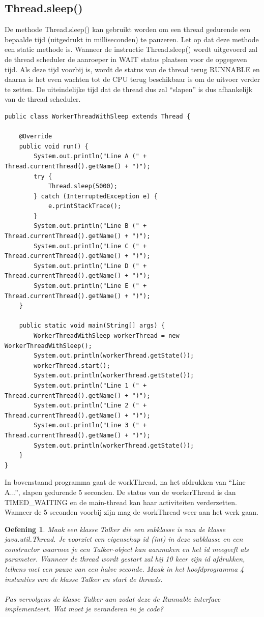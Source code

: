 \documentclass{tstextbook}
\newtheorem{envoefening}{Oefening}[chapter]
\newenvironment{oefening}
               {\begin{boxexercise}\begin{envoefening}}
               {\end{envoefening}\end{boxexercise}}
\begin{document}
\subsection{Thread.sleep()}

De methode Thread.sleep() kan gebruikt worden om een thread gedurende een bepaalde tijd (uitgedrukt in milliseconden) te pauzeren.
Let op dat deze methode een static methode is.
Wanneer de instructie Thread.sleep() wordt uitgevoerd zal de thread scheduler de aanroeper in WAIT status plaatsen voor de opgegeven tijd. Als deze tijd voorbij is, wordt de status van de thread terug RUNNABLE en daarna is het even wachten tot de CPU terug beschikbaar is om de uitvoer verder te zetten. De uiteindelijke tijd dat de thread dus zal ``slapen'' is dus afhankelijk van de thread scheduler.

\begin{lstlisting}
public class WorkerThreadWithSleep extends Thread {

	@Override
	public void run() {
		System.out.println("Line A (" + Thread.currentThread().getName() + ")");
		try {
			Thread.sleep(5000);
		} catch (InterruptedException e) {
			e.printStackTrace();
		}
		System.out.println("Line B (" + Thread.currentThread().getName() + ")");
		System.out.println("Line C (" + Thread.currentThread().getName() + ")");
		System.out.println("Line D (" + Thread.currentThread().getName() + ")");
		System.out.println("Line E (" + Thread.currentThread().getName() + ")");
	}

	public static void main(String[] args) {
		WorkerThreadWithSleep workerThread = new WorkerThreadWithSleep();
		System.out.println(workerThread.getState());
		workerThread.start();
		System.out.println(workerThread.getState());
		System.out.println("Line 1 (" + Thread.currentThread().getName() + ")");
		System.out.println("Line 2 (" + Thread.currentThread().getName() + ")");
		System.out.println("Line 3 (" + Thread.currentThread().getName() + ")");
		System.out.println(workerThread.getState());
	}
}
\end{lstlisting}

In bovenstaand programma gaat de workThread, na het afdrukken van ``Line A...'', slapen gedurende 5 seconden. De status van de workerThread is dan TIMED\_WAITING en de main-thread kan haar activiteiten verderzetten. Wanneer de 5 seconden voorbij zijn mag de workThread weer aan het werk gaan.

\begin{oefening}
Maak een klasse Talker die een subklasse is van de klasse java.util.Thread. 
Je voorziet een eigenschap id (int) in deze subklasse en een constructor waarmee je een Talker-object kan aanmaken en het id meegeeft als parameter. 
Wanneer de thread wordt gestart zal hij 10 keer zijn id afdrukken, telkens met een pauze van een halve seconde.
Maak in het hoofdprogramma 4 instanties van de klasse Talker en start de threads.
\\
\\
Pas vervolgens de klasse Talker aan zodat deze de Runnable interface implementeert. Wat moet je veranderen in je code?
\end{oefening}
\end{document}
